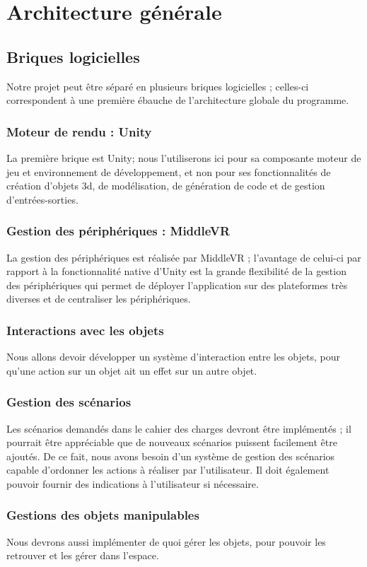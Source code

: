 \section{Architecture générale}
	\subsection{Briques logicielles}
		Notre projet peut être séparé en plusieurs briques logicielles ; celles-ci correspondent à une première ébauche de l'architecture globale du programme.
		\subsubsection{Moteur de rendu : Unity}
			La première brique est Unity; nous l'utiliserons ici pour sa composante moteur de jeu et environnement de développement, et non pour ses fonctionnalités de création d'objets 3d, de modélisation, de génération de code et de gestion d'entrées-sorties.
		\subsubsection{Gestion des périphériques : MiddleVR}
			La gestion des périphériques est réalisée par MiddleVR ; l'avantage de celui-ci par rapport à la fonctionnalité native d'Unity est la grande flexibilité de la gestion des périphériques qui permet de déployer l'application sur des plateformes très diverses et de centraliser les périphériques.
		\subsubsection{Interactions avec les objets}
			Nous allons devoir développer un système d'interaction entre les objets, pour qu'une action sur un objet ait un effet sur un autre objet.
		\subsubsection{Gestion des scénarios}
			Les scénarios demandés dans le cahier des charges devront être implémentés ; il pourrait être appréciable que de nouveaux scénarios puissent facilement être ajoutés.
			De ce fait, nous avons besoin d'un système de gestion des scénarios capable d'ordonner les actions à réaliser par l'utilisateur. Il doit également pouvoir fournir des indications à l'utilisateur si nécessaire.
		\subsubsection{Gestions des objets manipulables}
			Nous devrons aussi implémenter de quoi gérer les objets, pour pouvoir les retrouver et les gérer dans l'espace.
